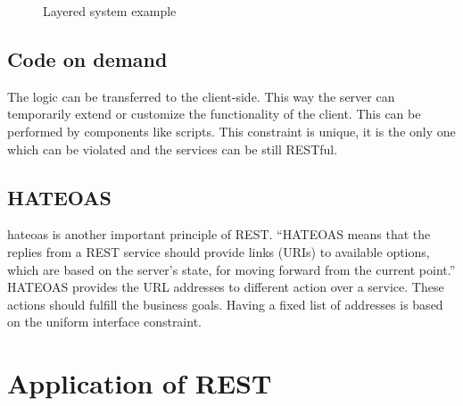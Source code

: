 \begin{figure}[htp] 
\caption{Layered system example}
\label{fig:layered-system}
\end{figure} 

\subsection{Code on demand}

The logic can be transferred to the client-side. This way the server can temporarily extend or customize the functionality of the client. This can be performed by components like \gls{scripts}.
This constraint is unique, it is the only one which can be violated and the services can be still RESTful.

\subsection{HATEOAS}
\gls{hateoas} is another important principle of REST. ``HATEOAS means that the replies from a REST service should provide links (URIs) to available options, which are based on the server's state, for moving forward from the current point.'' \cite{soa-patterns} HATEOAS provides the URL addresses to different action over a service. These actions should fulfill the business goals. Having a fixed list of addresses is based on the uniform interface constraint.

\section{Application of REST}

